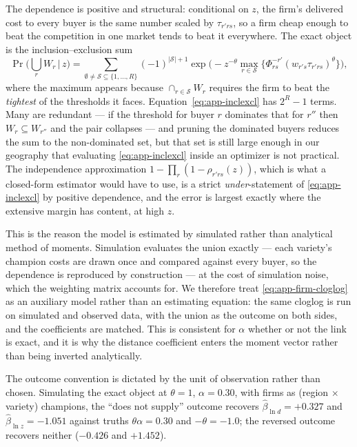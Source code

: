 The dependence is positive and structural: conditional on $z$, the firm's delivered cost to
every buyer is the same number scaled by $\tau_{r'rs}$, so a firm cheap enough to beat the
competition in one market tends to beat it everywhere. The exact object is the
inclusion--exclusion sum
\begin{equation}
\Pr\Big(\bigcup_{r}W_{r}\,\Big|\,z\Big)
=\sum_{\emptyset\neq\mathcal{S}\subseteq\{1,\dots,R\}}(-1)^{|\mathcal{S}|+1}
\exp\Big(-z^{-\theta}\max_{r\in\mathcal{S}}\big\{\Phi^{-r'}_{rs}(w_{r's}\tau_{r'rs})^{\theta}\big\}\Big),
\label{eq:app-inclexcl}
\end{equation}
where the maximum appears because $\cap_{r\in\mathcal{S}}W_{r}$ requires the firm to beat the
\emph{tightest} of the thresholds it faces. Equation~\eqref{eq:app-inclexcl} has $2^{R}-1$
terms. Many are redundant --- if the threshold for buyer $r$ dominates that for $r''$ then
$W_{r}\subseteq W_{r''}$ and the pair collapses --- and pruning the dominated buyers reduces the
sum to the non-dominated set, but that set is still large enough in our geography that
evaluating \eqref{eq:app-inclexcl} inside an optimizer is not practical. The independence
approximation $1-\prod_{r}(1-\rho_{r'rs}(z))$, which is what a closed-form estimator would have
to use, is a strict \emph{under}-statement of \eqref{eq:app-inclexcl} by positive dependence, and
the error is largest exactly where the extensive margin has content, at high $z$.

This is the reason the model is estimated by simulated rather than analytical method of moments.
Simulation evaluates the union exactly --- each variety's champion costs are drawn once and
compared against every buyer, so the dependence is reproduced by construction --- at the cost of
simulation noise, which the weighting matrix accounts for. We therefore treat
\eqref{eq:app-firm-cloglog} as an auxiliary model rather than an estimating equation: the same
cloglog is run on simulated and observed data, with the union as the outcome on both sides, and
the coefficients are matched. This is consistent for $\alpha$ whether or not the link is exact,
and it is why the distance coefficient enters the moment vector rather than being inverted
analytically.

The outcome convention is dictated by the unit of observation rather than chosen. Simulating the
exact object at $\theta=1$, $\alpha=0.30$, with firms as (region $\times$ variety) champions,
the ``does not supply'' outcome recovers $\hat\beta_{\ln d}=+0.327$ and
$\hat\beta_{\ln z}=-1.051$ against truths $\theta\alpha=0.30$ and $-\theta=-1.0$; the reversed
outcome recovers neither ($-0.426$ and $+1.452$).

